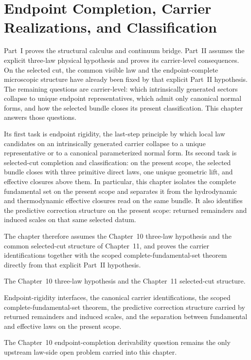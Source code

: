 \section{Endpoint Completion, Carrier Realizations, and Classification}
\label{sec:carrier-faces-and-completion}

Part~I proves the structural calculus and continuum bridge. Part~II assumes
the explicit three-law physical hypothesis and proves its carrier-level
consequences. On the selected cut, the common visible law and the
endpoint-complete microscopic structure have already been fixed by that
explicit Part~II hypothesis. The remaining questions are carrier-level: which
intrinsically generated sectors collapse to unique endpoint representatives,
which admit only canonical normal forms, and how the selected bundle closes
its present classification. This chapter answers those questions.

Its first task is endpoint rigidity, the last-step principle by which local
law candidates on an intrinsically generated carrier collapse to a unique
representative or to a canonical parameterized normal form. Its second task is
selected-cut completion and classification: on the present scope, the
selected bundle closes with three primitive direct laws, one unique geometric
lift, and effective closures above them. In particular, this chapter isolates
the complete fundamental set on the present scope and separates it from the
hydrodynamic and thermodynamic effective closures read on the same bundle.
It also identifies the predictive correction structure on the present scope:
returned remainders and induced scales on that same selected datum.

The chapter therefore assumes the Chapter~10 three-law hypothesis and the common
selected-cut structure of Chapter~11, and proves the carrier
identifications together with the scoped complete-fundamental-set theorem
directly from that explicit Part~II hypothesis.

\begin{tcolorbox}[colback=white, colframe=black!75, boxrule=0.9pt, title={Chapter 12 at a glance}]
\begin{description}[leftmargin=1.7em, itemsep=0.25em]
\item[Assumes.] The Chapter~10 three-law hypothesis and the Chapter~11
      selected-cut structure.
\item[Proves.] Endpoint-rigidity interfaces, the canonical carrier
      identifications, the scoped complete-fundamental-set theorem, the
      predictive correction structure carried by returned remainders and
      induced scales, and the separation between fundamental and effective
      laws on the present scope.
\item[Open.] The Chapter~10 endpoint-completion derivability question remains
      the only upstream law-side open problem carried into this chapter.
\end{description}
\end{tcolorbox}

